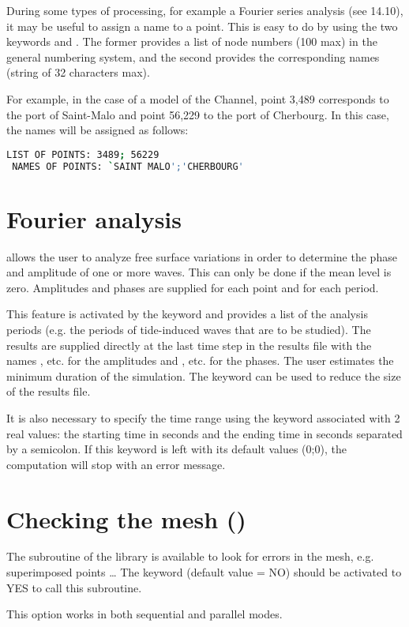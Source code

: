 During some types of processing, for example a Fourier series analysis
(see 14.10),
it may be useful to assign a name to a point.
This is easy to do by using the two keywords 
and .
The former provides a list of node numbers (100 max) in the general numbering
system,
and the second provides the corresponding names (string of 32 characters max).

For example, in the case of a model of the Channel, point 3,489 corresponds
to the port of Saint-Malo and point 56,229 to the port of Cherbourg.
In this case, the names will be assigned as follows:
\begin{lstlisting}[language=bash]
 LIST OF POINTS: 3489; 56229
 NAMES OF POINTS: `SAINT MALO';'CHERBOURG'
\end{lstlisting}

\section{Fourier analysis}

 allows the user to analyze free surface variations
in order to determine the phase and amplitude of one or more waves.
This can only be done if the mean level is zero.
Amplitudes and phases are supplied for each point and for each period.

This feature is activated by the keyword  and
provides a list of the analysis periods (e.g. the periods of tide-induced waves
that are to be studied).
The results are supplied directly at the last time step in the results file with
the names ,  etc. for the amplitudes
and ,  etc. for the phases.
The user estimates the minimum duration of the simulation.
The keyword 
can be used to reduce the size of the results file.

It is also necessary to specify the time range using the keyword
 associated with 2 real values:
the starting time in seconds and the ending time in seconds separated by a
semicolon.
If this keyword is left with its default values (0;0),
the computation will stop with an error message.

\section{Checking the mesh ()}

The  subroutine of the \bief library is available to look for
errors in the mesh, e.g. superimposed points \ldots
The keyword  (default value = NO) should be activated
to YES to call this subroutine.

This option works in both sequential and parallel modes.
